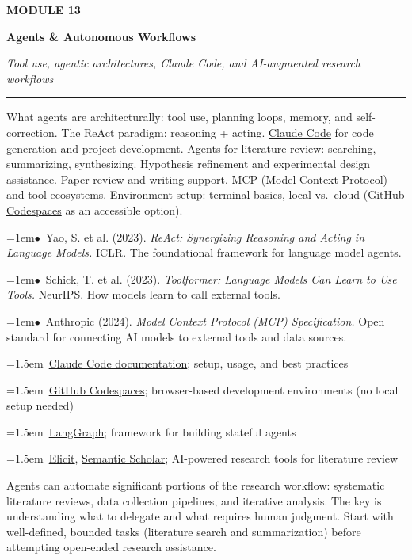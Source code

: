 \documentclass[11pt, a4paper]{article}
\newcommand{\modulehead}[3]{%
  \vspace{0.5em}
  {\small\sffamily\bfseries\textcolor{accent}{MODULE #1}}\par\vspace{-0.3em}
  {\Large\sffamily\bfseries\textcolor{dark}{#2}}\par\vspace{-0.2em}
  {\small\textit{\textcolor{muted}{#3}}}\par
  \vspace{0.2em}\textcolor{bordercol}{\rule{\textwidth}{0.3pt}}\par
}
\newcommand{\seclabel}[1]{%
  \vspace{0.6em}{\normalsize\sffamily\bfseries\textcolor{accent}{#1}}\par\vspace{0.2em}
}
\newcommand{\refpaper}[1]{%
  \par\hangindent=1em\hangafter=1\noindent\textcolor{accent}{\small$\bullet$}~{\small #1}\par
}
\newcommand{\resource}[1]{%
  \par\hangindent=1.5em\hangafter=1\noindent\hspace{0.5em}{\small\textcolor{accent}{\guilsinglright}}~{\small #1}\par
}
\begin{document}
\newpage
\modulehead{13}{Agents \& Autonomous Workflows}{Tool use, agentic architectures, Claude Code, and AI-augmented research workflows}

\seclabel{Core Concepts}

What agents are architecturally: tool use, planning loops, memory, and self-correction. The ReAct paradigm: reasoning + acting. \href{https://docs.anthropic.com/en/docs/claude-code}{Claude Code} for code generation and project development. Agents for literature review: searching, summarizing, synthesizing. Hypothesis refinement and experimental design assistance. Paper review and writing support. \href{https://modelcontextprotocol.io}{MCP} (Model Context Protocol) and tool ecosystems. Environment setup: terminal basics, local vs.\ cloud (\href{https://github.com/features/codespaces}{GitHub Codespaces} as an accessible option).

\seclabel{Core Readings}

\refpaper{Yao, S. et al. (2023). \textit{ReAct: Synergizing Reasoning and Acting in Language Models.} ICLR. The foundational framework for language model agents.}

\refpaper{Schick, T. et al. (2023). \textit{Toolformer: Language Models Can Learn to Use Tools.} NeurIPS. How models learn to call external tools.}

\refpaper{Anthropic (2024). \textit{Model Context Protocol (MCP) Specification.} Open standard for connecting AI models to external tools and data sources.}

\seclabel{Further Resources}

\resource{\href{https://docs.anthropic.com/en/docs/claude-code}{Claude Code documentation}; setup, usage, and best practices}

\resource{\href{https://github.com/features/codespaces}{GitHub Codespaces}; browser-based development environments (no local setup needed)}

\resource{\href{https://langchain-ai.github.io/langgraph/}{LangGraph}; framework for building stateful agents}

\resource{\href{https://elicit.com}{Elicit}, \href{https://www.semanticscholar.org}{Semantic Scholar}; AI-powered research tools for literature review}

\begin{appblock}
Agents can automate significant portions of the research workflow: systematic literature reviews, data collection pipelines, and iterative analysis. The key is understanding what to delegate and what requires human judgment. Start with well-defined, bounded tasks (literature search and summarization) before attempting open-ended research assistance.
\end{appblock}
\end{document}
